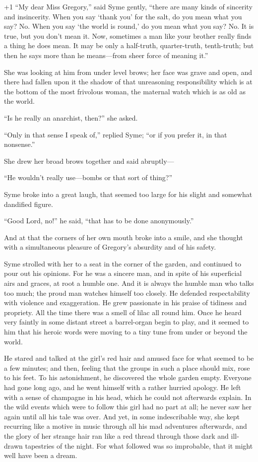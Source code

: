 \looseness+1
“My dear Miss Gregory,” said Syme gently, “there are many kinds of sincerity and insincerity. When you say ‘thank you’ for the salt, do you mean what you say? No. When you say ‘the world is round,’ do you mean what you say? No. It is true, but you don’t mean it. Now, sometimes a man like your brother really finds a thing he does mean. It may be only a half-truth, quarter-truth, tenth-truth; but then he says more than he means⁠—from sheer force of meaning it.”

She was looking at him from under level brows; her face was grave and open, and there had fallen upon it the shadow of that unreasoning responsibility which is at the bottom of the most frivolous woman, the maternal watch which is as old as the world.

“Is he really an anarchist, then?” she asked.

“Only in that sense I speak of,” replied Syme; “or if you prefer it, in that nonsense.”

She drew her broad brows together and said abruptly⁠—

“He wouldn’t really use⁠—bombs or that sort of thing?”

Syme broke into a great laugh, that seemed too large for his slight and somewhat dandified figure.

“Good Lord, no!” he said, “that has to be done anonymously.”

And at that the corners of her own mouth broke into a smile, and she thought with a simultaneous pleasure of Gregory’s absurdity and of his safety.

Syme strolled with her to a seat in the corner of the garden, and continued to pour out his opinions. For he was a sincere man, and in spite of his superficial airs and graces, at root a humble one. And it is always the humble man who talks too much; the proud man watches himself too closely. He defended respectability with violence and exaggeration. He grew passionate in his praise of tidiness and propriety. All the time there was a smell of lilac all round him. Once he heard very faintly in some distant street a barrel-organ begin to play, and it seemed to him that his heroic words were moving to a tiny tune from under or beyond the world.

He stared and talked at the girl’s red hair and amused face for what seemed to be a few minutes; and then, feeling that the groups in such a place should mix, rose to his feet. To his astonishment, he discovered the whole garden empty. Everyone had gone long ago, and he went himself with a rather hurried apology. He left with a sense of champagne in his head, which he could not afterwards explain. In the wild events which were to follow this girl had no part at all; he never saw her again until all his tale was over. And yet, in some indescribable way, she kept recurring like a motive in music through all his mad adventures afterwards, and the glory of her strange hair ran like a red thread through those dark and ill-drawn tapestries of the night. For what followed was so improbable, that it might well have been a dream.


